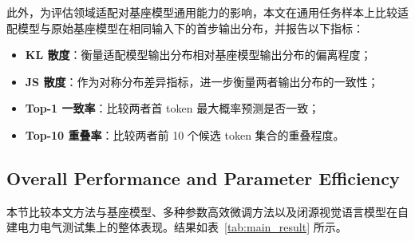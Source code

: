 \documentclass[journal]{IEEEtran}
\begin{document}
此外，为评估领域适配对基座模型通用能力的影响，本文在通用任务样本上比较适配模型与原始基座模型在相同输入下的首步输出分布，并报告以下指标：
\begin{itemize}
    \item \textbf{KL 散度}：衡量适配模型输出分布相对基座模型输出分布的偏离程度；
    \item \textbf{JS 散度}：作为对称分布差异指标，进一步衡量两者输出分布的一致性；
    \item \textbf{Top-1 一致率}：比较两者首 token 最大概率预测是否一致；
    \item \textbf{Top-10 重叠率}：比较两者前 10 个候选 token 集合的重叠程度。
\end{itemize}

\subsection{Overall Performance and Parameter Efficiency}

本节比较本文方法与基座模型、多种参数高效微调方法以及闭源视觉语言模型在自建电力电气测试集上的整体表现。结果如表~\ref{tab:main_result} 所示。
\end{document}

